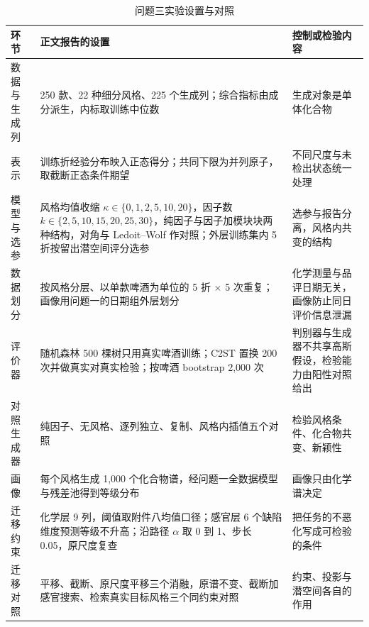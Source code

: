 \begin{table}[H]
\centering\small
\caption{问题三实验设置与对照}
\label{tab:q3-setup}
\begin{tabular}{p{3.0cm}p{5.4cm}p{4.2cm}}
\toprule
环节 & 正文报告的设置 & 控制或检验内容 \\
\midrule
数据与生成列 & 250 款、22 种细分风格、225 个生成列；综合指标由成分派生，内标取训练中位数 & 生成对象是单体化合物 \\
\addlinespace
表示 & 训练折经验分布映入正态得分；共同下限为并列原子，取截断正态条件期望 & 不同尺度与未检出状态统一处理 \\
\addlinespace
模型与选参 & 风格均值收缩 $\kappa\in\{0,1,2,5,10,20\}$，因子数 $k\in\{2,5,10,15,20,25,30\}$，纯因子与因子加模块块两种结构，对角与 Ledoit--Wolf 作对照；外层训练集内 5 折按留出潜空间评分选参 & 选参与报告分离，风格内共变的结构 \\
\addlinespace
数据划分 & 按风格分层、以单款啤酒为单位的 5 折 $\times$ 5 次重复；画像用问题一的日期组外层划分 & 化学测量与品评日期无关，画像防止同日评价信息泄漏 \\
\addlinespace
评价器 & 随机森林 500 棵树只用真实啤酒训练；C2ST 置换 200 次并做真实对真实检验；按啤酒 bootstrap 2,000 次 & 判别器与生成器不共享高斯假设，检验能力由阳性对照给出 \\
\addlinespace
对照生成器 & 纯因子、无风格、逐列独立、复制、风格内插值五个对照 & 检验风格条件、化合物共变、新颖性 \\
\addlinespace
画像 & 每个风格生成 1,000 个化合物谱，经问题一全数据模型与残差池得到等级分布 & 画像只由化学谱决定 \\
\addlinespace
迁移约束 & 化学层 9 列，阈值取附件八均值口径；感官层 6 个缺陷维度预测等级不升高；沿路径 $\alpha$ 取 0 到 1、步长 0.05，原尺度复查 & 把任务的不恶化写成可检验的条件 \\
\addlinespace
迁移对照 & 平移、截断、原尺度平移三个消融，原谱不变、截断加感官搜索、检索真实目标风格三个同约束对照 & 约束、投影与潜空间各自的作用 \\
\bottomrule
\end{tabular}
\end{table}

